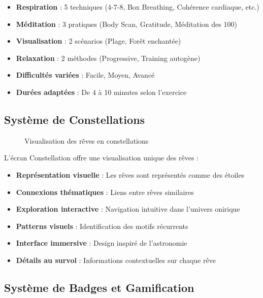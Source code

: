 \documentclass[12pt,a4paper]{article}
\begin{document}
\begin{itemize}
    \item \textbf{Respiration} : 5 techniques (4-7-8, Box Breathing, Cohérence cardiaque, etc.)
    \item \textbf{Méditation} : 3 pratiques (Body Scan, Gratitude, Méditation des 100)
    \item \textbf{Visualisation} : 2 scénarios (Plage, Forêt enchantée)
    \item \textbf{Relaxation} : 2 méthodes (Progressive, Training autogène)
    \item \textbf{Difficultés variées} : Facile, Moyen, Avancé
    \item \textbf{Durées adaptées} : De 4 à 10 minutes selon l'exercice
\end{itemize}

\subsection{Système de Constellations}

\begin{figure}[H]
    \centering
    \caption{Visualisation des rêves en constellations}
\end{figure}

L'écran Constellation offre une visualisation unique des rêves :

\begin{itemize}
    \item \textbf{Représentation visuelle} : Les rêves sont représentés comme des étoiles
    \item \textbf{Connexions thématiques} : Liens entre rêves similaires
    \item \textbf{Exploration interactive} : Navigation intuitive dans l'univers onirique
    \item \textbf{Patterns visuels} : Identification des motifs récurrents
    \item \textbf{Interface immersive} : Design inspiré de l'astronomie
    \item \textbf{Détails au survol} : Informations contextuelles sur chaque rêve
\end{itemize}

\subsection{Système de Badges et Gamification}
\end{document}
